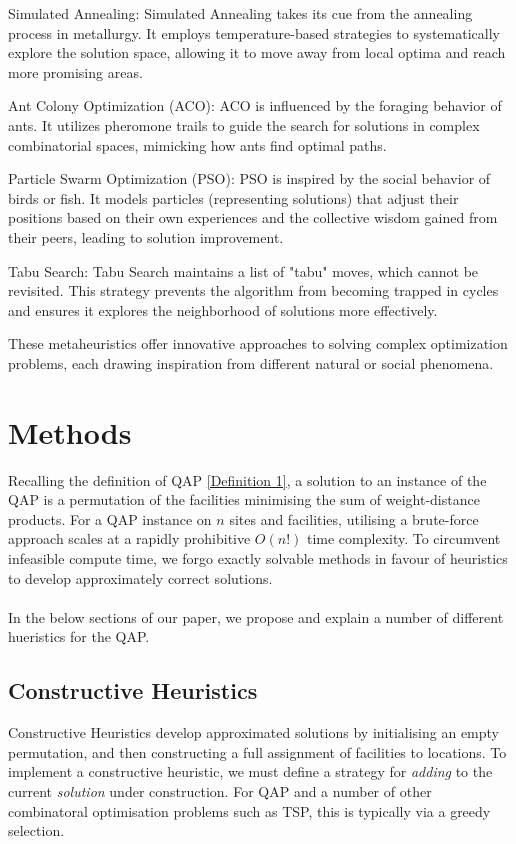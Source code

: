 \documentclass[a4paper,10pt]{article}
\begin{document}
Simulated Annealing: Simulated Annealing takes its cue from the annealing process in metallurgy. It employs temperature-based strategies to systematically explore the solution space, allowing it to move away from local optima and reach more promising areas.

Ant Colony Optimization (ACO): ACO is influenced by the foraging behavior of ants. It utilizes pheromone trails to guide the search for solutions in complex combinatorial spaces, mimicking how ants find optimal paths.

Particle Swarm Optimization (PSO): PSO is inspired by the social behavior of birds or fish. It models particles (representing solutions) that adjust their positions based on their own experiences and the collective wisdom gained from their peers, leading to solution improvement.

Tabu Search: Tabu Search maintains a list of "tabu" moves, which cannot be revisited. This strategy prevents the algorithm from becoming trapped in cycles and ensures it explores the neighborhood of solutions more effectively.

These metaheuristics offer innovative approaches to solving complex optimization problems, each drawing inspiration from different natural or social phenomena.


\newpage
\section{Methods}
Recalling the definition of QAP \ref{Definition 1}, a solution to an instance of the QAP is a permutation of the facilities minimising the sum of weight-distance products. For a QAP instance on $n$ sites and facilities, utilising a brute-force approach scales at a rapidly prohibitive $O(n!)$ time complexity. To circumvent infeasible compute time, we forgo exactly solvable methods in favour of heuristics to develop approximately correct solutions. \\
\\
In the below sections of our paper, we propose and explain a number of different hueristics for the QAP.

\subsection{Constructive Heuristics}
Constructive Heuristics develop approximated solutions by initialising an empty permutation, and then constructing a full assignment of facilities to locations. To implement a constructive heuristic, we must define a strategy for \textit{adding} to the current \textit{solution} under construction. For QAP and a number of other combinatoral optimisation problems such as TSP, this is typically via a greedy selection. 
\end{document}
